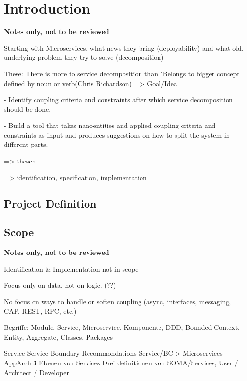 \chapter{Introduction}

\textbf{Notes only, not to be reviewed}

Starting with Microservices, what news they bring (deployability) and what old, underlying problem they try to solve (decomposition)

These: There is more to service decomposition than "Belongs to bigger concept defined by noun or verb(Chris Richardson)
=> Goal/Idea

- Identify coupling criteria and constraints after which service 
decomposition should be done. 

- Build a tool that takes nanoentities and applied coupling criteria and constraints as input and produces suggestions on how to split the system in different parts. 

=> thesen

=> identification, specification, implementation

\section{Project Definition}



\section{Scope}

\textbf{Notes only, not to be reviewed}

Identification \& Implementation not in scope

Focus only on data, not on logic. (??)

No focus on ways to handle or soften coupling (async, interfaces, messaging, CAP, REST, RPC, etc.)

Begriffe: Module, Service, Microservice, Komponente, DDD, Bounded Context, Entity, Aggregate, Classes, Packages

Service
Service Boundary Recommondations
Service/BC > Microservices 
AppArch 3 Ebenen von Services
Drei definitionen von SOMA/Services, User / Architect / Developer